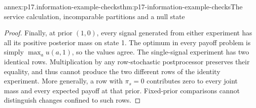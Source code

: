 \begin{annexitem}{annex:p17.information-example-checks}{thm:p17-information-example-checks}{The service calculation, incomparable partitions and a null state}
\begin{proof}
Finally, at prior \((1,0)\), every signal generated from either experiment
has all its positive posterior mass on state 1. The optimum in every
payoff problem is simply \(\max_a u(a,1)\), so the values agree.
The single-signal experiment has two identical rows. Multiplication by
any row-stochastic postprocessor preserves their equality, and thus
cannot produce the two different rows of the identity experiment.
More generally, a row with \(\pi_s=0\) contributes zero to every joint
mass and every expected payoff at that prior. Fixed-prior comparisons
cannot distinguish changes confined to such rows.
\end{proof}
\end{annexitem}
